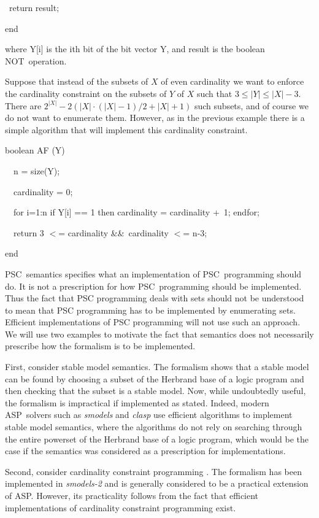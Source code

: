 \documentclass[letterpaper]{article}\usepackage{aaai}
\begin{document}
\ {\small return result;}

{\small end}

where Y[i] is the ith bit of the bit vector Y, and result is the
boolean NOT\ operation.

Suppose that instead of the subsets of $X$ of even cardinality we want to
enforce the cardinality constraint on the subsets of $Y$ of $X$ such that
$3\leq\left\vert Y\right\vert \leq\left\vert X\right\vert -3$. There are
$2^{\left\vert X\right\vert }-2(\left\vert X\right\vert \cdot\left(
\left\vert X\right\vert -1\right)  /2+\left\vert X\right\vert +1)$ such
subsets, and of course we do not want to enumerate them. However, as in the
previous example there is a simple algorithm that will implement this
cardinality constraint.

{\small boolean AF (Y)\ }

{\small \ \ n = size(Y);}

{\small \ \ cardinality = 0;}

{\small \ \ for i=1:n if Y[i] == 1 then cardinality = cardinality +\ 1;
endfor;}

{\small \ \ return 3
$<$= cardinality \&\&\ cardinality
$<$= n-3;}

{\small end}

PSC\ semantics specifies what an implementation of PSC\ programming should do.
It is not a prescription for how PSC\ programming should be implemented. Thus
the fact that PSC programming deals with sets should not be understood to mean
that PSC programming has to be implemented by enumerating sets. Efficient
implementations of PSC programming will not use such an approach. We will use
two examples to motivate the fact that semantics does not necessarily
prescribe how the formalism is to be implemented.

First, consider stable model semantics. The formalism shows that a stable
model can be found by choosing a subset of the Herbrand base of a logic
program and then checking that the subset is a stable model. Now, while
undoubtedly useful, the formalism is impractical if implemented as stated.
Indeed, modern ASP\ solvers such as \emph{smodels }\cite{SimonsNS02} and
\emph{clasp }\cite{GebserKNS07} use efficient algorithms to implement stable
model semantics, where the algorithms do not rely on searching through the
entire powerset of the Herbrand base of a logic program, which would be the
case if the semantics was considered as a prescription for implementations.

Second, consider cardinality constraint programming \cite{NSS99}. The
formalism has been implemented in \emph{smodels-2} \cite{Simons99} and is
generally considered to be a practical extension of ASP. However, its
practicality follows from the fact that efficient implementations of
cardinality constraint programming exist.
\end{document}
